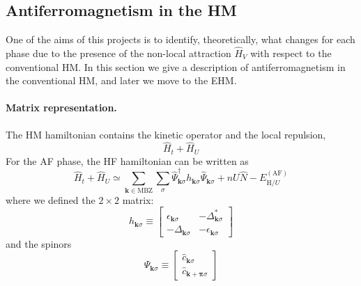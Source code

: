 \subsection{Antiferromagnetism in the HM}\label{subsec:af-hm}

One of the aims of this projects is to identify, theoretically, what changes for each phase due to the presence of the non-local attraction $\hat H_V$ with respect to the conventional HM. In this section we give a description of antiferromagnetism in the conventional HM, and later we move to the EHM.

\paragraph{Matrix representation.}

The HM hamiltonian contains the kinetic operator and the local repulsion,
\[
\hat H_t + \hat H_U
\]
For the AF phase, the HF hamiltonian can be written as
\begin{equation}\label{eq:af-HM-hk}
	\hat H_t + \hat H_U \simeq \sum_{\mathbf{k} \in \mathrm{MBZ}} \sum_\sigma \hat \Psi_{\mathbf{k}\sigma}^\dagger h_{\mathbf{k}\sigma} \hat \Psi_{\mathbf{k}\sigma} + nU \hat N -  E_{\mathrm{H}/U}^{(\mathrm{AF})}
\end{equation}
where we defined the $2 \times 2$ matrix:
\begin{equation}\label{eq:af-hk}
	h_{\mathbf{k}\sigma} \equiv \begin{bmatrix}
		\epsilon_{\mathbf{k}\sigma} & -\Delta_{\mathbf{k}\sigma}^* \\
		-\Delta_{\mathbf{k}\sigma} & - \epsilon_{\mathbf{k}\sigma}
	\end{bmatrix}
\end{equation}
and the spinors
\begin{equation}\label{eq:af-Psi-def}
	\hat \Psi_{\mathbf{k}\sigma} \equiv \begin{bmatrix}
		\hat c_{\mathbf{k}\sigma} \\
		\hat c_{\mathbf{k}+\bm{\pi}\sigma} 
	\end{bmatrix}
\end{equation}

